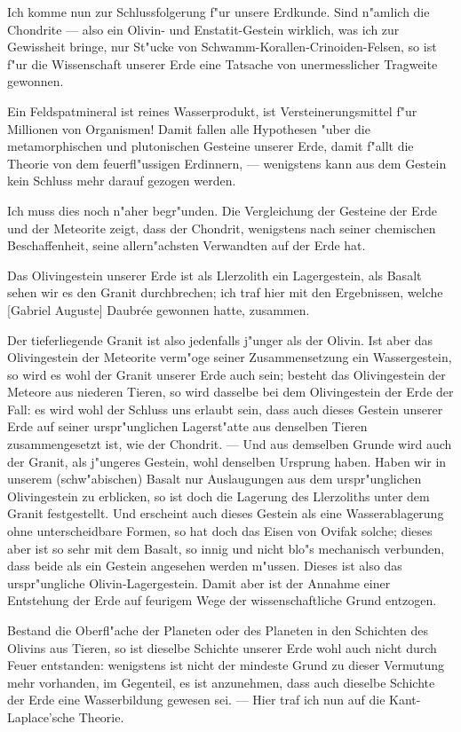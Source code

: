 \documentclass[a4paper, 11pt, oneside]{article}
\begin{document}
Ich komme nun zur Schlussfolgerung f"ur unsere Erdkunde. Sind n"amlich die Chondrite --- also ein Olivin- und Enstatit-Gestein wirklich, was ich zur Gewissheit bringe, nur St"ucke von Schwamm-Korallen-Crinoiden-Felsen, so ist f"ur die Wissenschaft unserer Erde eine Tatsache von unermesslicher Tragweite gewonnen.

Ein Feldspatmineral ist reines Wasserprodukt, ist Versteinerungsmittel f"ur Millionen von Organismen! Damit fallen alle Hypothesen "uber die metamorphischen und plutonischen Gesteine unserer Erde, damit f"allt die Theorie von dem feuerfl"ussigen Erdinnern, --- wenigstens kann aus dem Gestein kein Schluss mehr darauf gezogen werden.

Ich muss dies noch n"aher begr"unden. Die Vergleichung der Gesteine der Erde und der Meteorite zeigt, dass der Chondrit, wenigstens nach seiner chemischen Beschaffenheit, seine allern"achsten Verwandten auf der Erde hat.

Das Olivingestein unserer Erde ist als Llerzolith ein Lagergestein, als Basalt sehen wir es den Granit durchbrechen; ich traf hier mit den Ergebnissen, welche [Gabriel Auguste] Daubrée gewonnen hatte, zusammen.

Der tieferliegende Granit ist also jedenfalls j"unger als der Olivin. Ist aber das Olivingestein der Meteorite verm"oge seiner Zusammensetzung ein Wassergestein, so wird es wohl der Granit unserer Erde auch sein; besteht das Olivingestein der Meteore aus niederen Tieren, so wird dasselbe bei dem Olivingestein der Erde der Fall: es wird wohl der Schluss uns erlaubt sein, dass auch dieses Gestein unserer Erde auf seiner urspr"unglichen Lagerst"atte aus denselben Tieren zusammengesetzt ist, wie der Chondrit. --- Und aus demselben Grunde wird auch der Granit, als j"ungeres Gestein, wohl denselben Ursprung haben. Haben wir in unserem (schw"abischen) Basalt nur Auslaugungen aus dem urspr"unglichen Olivingestein zu erblicken, so ist doch die Lagerung des Llerzoliths unter dem Granit festgestellt. Und erscheint auch dieses Gestein als eine Wasserablagerung ohne unterscheidbare Formen, so hat doch das Eisen von Ovifak solche; dieses aber ist so sehr mit dem Basalt, so innig und nicht blo"s mechanisch verbunden, dass beide als ein Gestein angesehen werden m"ussen. Dieses ist also das urspr"ungliche Olivin-Lagergestein. Damit aber ist der Annahme einer Entstehung der Erde auf feurigem Wege der wissenschaftliche Grund entzogen.

Bestand die Oberfl"ache der Planeten oder des Planeten in den Schichten des Olivins aus Tieren, so ist dieselbe Schichte unserer Erde wohl auch nicht durch Feuer entstanden: wenigstens ist nicht der mindeste Grund zu dieser Vermutung mehr vorhanden, im Gegenteil, es ist anzunehmen, dass auch dieselbe Schichte der Erde eine Wasserbildung gewesen sei. --- Hier traf ich nun auf die Kant-Laplace'sche Theorie.
\end{document}
